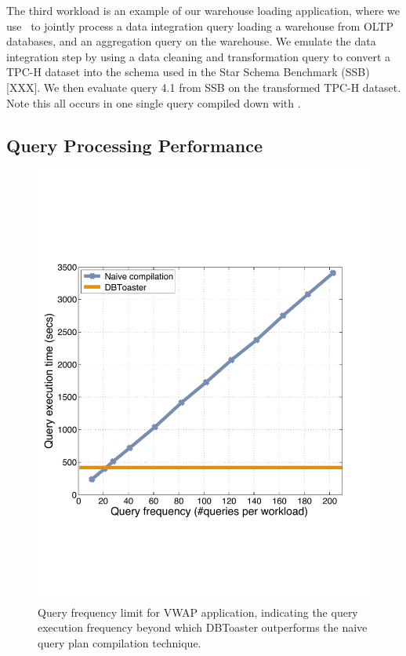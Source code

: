 The third workload is an example of our warehouse loading application, where we
use \compiler\ to jointly process a data integration query loading a warehouse
from OLTP databases, and an aggregation query on the warehouse. We emulate the
data integration step by using a data cleaning and transformation query to
convert a TPC-H dataset into the schema used in the Star Schema Benchmark
(SSB) [XXX]. We then evaluate query 4.1 from SSB on the transformed TPC-H
dataset. Note this all occurs in one single query compiled down with \compiler.




\subsection{Query Processing Performance}

\begin{figure}
\begin{center}
\includegraphics[scale=0.25]{../plots/vwap_query_freq_dn}
\end{center}
\caption{Query frequency limit for VWAP application, indicating the
query execution frequency beyond which DBToaster outperforms the naive query
plan compilation technique.}
\label{fig:vwap_query_freq}
\end{figure}

